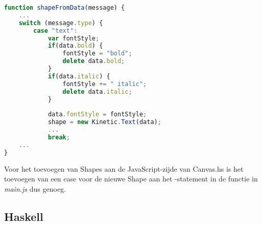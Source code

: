 \begin{lstlisting}[language=JavaScript]
function shapeFromData(message) {
	...
	switch (message.type) {
		case "text":
			var fontStyle;
			if(data.bold) {
				fontStyle = "bold";
				delete data.bold;
			}
			if(data.italic) {
				fontStyle += " italic";
				delete data.italic;
			}
			
			data.fontStyle = fontStyle;
			shape = new Kinetic.Text(data);
			...
			break;
	...
}
\end{lstlisting}

Voor het toevoegen van Shapes aan de JavaScript-zijde van Canvas.hs is het toevoegen van een case voor de nieuwe Shape aan het -statement in de  functie in \emph{main.js} dus genoeg.

\subsection{Haskell}

